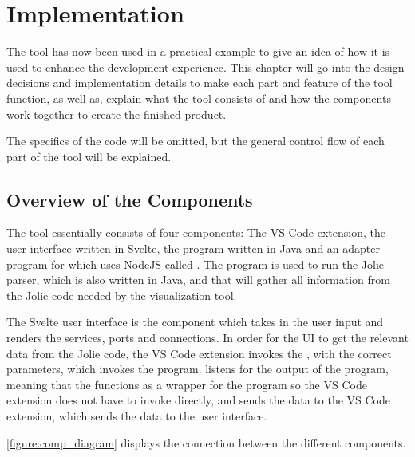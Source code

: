 \chapter{Implementation}
The tool has now been used in a practical example to give an idea of how it is used to enhance the development experience.
This chapter will go into the design decisions and implementation details to make each part and feature of the tool function, as well as,
explain what the tool consists of and how the components work together to create the finished product.

The specifics of the code will be omitted, but the general control flow of each part of the tool will be explained.

\section{Overview of the Components}
The tool essentially consists of four components: The VS Code extension, the user interface written in Svelte, the \javatoolname[] program written in Java and an adapter program for \javatoolname[] which uses NodeJS called \nodetoolname[].
The \javatoolname[] program is used to run the Jolie parser, which is also written in Java, and that will gather all information from the Jolie code needed by the visualization tool.

The Svelte user interface is the component which takes in the user input and renders the services, ports and connections.
In order for the UI to get the relevant data from the Jolie code, the VS Code extension invokes the \nodetoolname[], with the correct parameters, which invokes the \javatoolname[] program.
\nodetoolname[] listens for the output of the \javatoolname[] program,
meaning that the \nodetoolname[] functions as a wrapper for the \javatoolname[] program so the VS Code extension does not have to invoke \javatoolname[] directly,
and sends the data to the VS Code extension, which sends the data to the user interface.

\cref{figure:comp_diagram} displays the connection between the different components.

